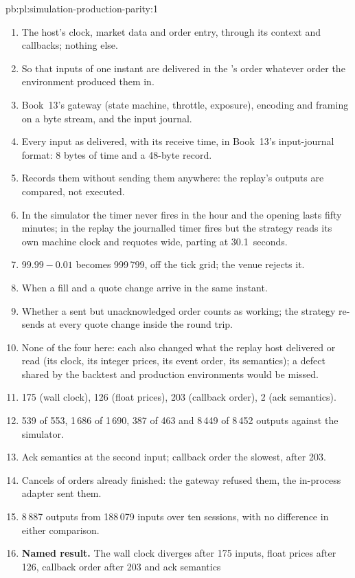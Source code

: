 \begin{solution}{pb:pl:simulation-production-parity:1}
\begin{enumerate}
\item The host's clock, market data and order entry, through its context and callbacks; nothing else.
\item So that inputs of one instant are delivered in the 's order whatever order the environment produced them in.
\item Book~13's gateway (state machine, throttle, exposure), encoding and framing on a byte stream, and the input journal.
\item Every input as delivered, with its receive time, in Book~13's input-journal format: 8 bytes of time and a 48-byte record.
\item Records them without sending them anywhere: the replay's outputs are compared, not executed.
\item In the simulator the timer never fires in the hour and the opening lasts fifty minutes; in the replay the journalled timer fires but the
strategy reads its own machine clock and requotes wide, parting at 30.1~seconds.
\item $99.99 - 0.01$ becomes 999\,799, off the tick grid; the venue rejects it.
\item When a fill and a quote change arrive in the same instant.
\item Whether a sent but unacknowledged order counts as working; the strategy re-sends at every quote change inside the round trip.
\item None of the four here: each also changed what the replay host delivered or read (its clock, its integer prices, its event order, its
semantics); a defect shared by the backtest and production environments would be missed.
\item 175 (wall clock), 126 (float prices), 203 (callback order), 2 (ack semantics).
\item 539 of 553, 1\,686 of 1\,690, 387 of 463 and 8\,449 of 8\,452 outputs against the simulator.
\item Ack semantics at the second input; callback order the slowest, after 203.
\item Cancels of orders already finished: the gateway refused them, the in-process adapter sent them.
\item 8\,887 outputs from 188\,079 inputs over ten sessions, with no difference in either comparison.
\item \textbf{Named result.} The wall clock diverges after 175 inputs, float prices after 126, callback order after 203 and ack semantics

\end{enumerate}
\end{solution}
